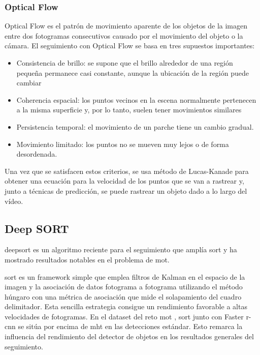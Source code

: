 \subsubsection*{Optical Flow}
\label{subsubsec:optical-flow}

Optical Flow es el patrón de movimiento aparente de los objetos de la imagen entre dos fotogramas consecutivos causado por el movimiento del objeto o la cámara. El seguimiento con Optical Flow se basa en tres supuestos importantes:

\begin{itemize}
    \item Consistencia de brillo: se supone que el brillo alrededor de una región pequeña permanece casi constante, aunque la ubicación de la región puede cambiar
    \item Coherencia espacial: los puntos vecinos en la escena normalmente pertenecen a la misma superficie y, por lo tanto, suelen tener movimientos similares
    \item Persistencia temporal: el movimiento de un parche tiene un cambio gradual.
    \item Movimiento limitado: los puntos no se mueven muy lejos o de forma desordenada.
\end{itemize}

Una vez que se satisfacen estos criterios, se usa método de Lucas-Kanade para obtener una ecuación para la velocidad de los puntos que se van a rastrear y, junto a técnicas de predicción, se puede rastrear un objeto dado a lo largo del vídeo.

\subsection{Deep SORT}
\label{subsec:deepsort-algorithm}

\gls{deepsort} \cite{Wojke2017simple} es un algoritmo reciente para el seguimiento que amplía \gls{sort} \cite{Bewley_2016} y ha mostrado resultados notables en el problema de \gls{mot}.

\gls{sort} es un framework simple que emplea filtros de Kalman en el espacio de la imagen y la asociación de datos fotograma a fotograma utilizando el método húngaro con una métrica de asociación que mide el solapamiento del cuadro delimitador. Esta sencilla estrategia consigue un rendimiento favorable a altas velocidades de fotogramas. En el dataset del reto \gls{mot} \cite{lealtaixe2015motchallenge}, \gls{sort} junto con Faster \gls{r-cnn} se sitúa por encima de \gls{mht} en las detecciones estándar. Esto remarca la influencia del rendimiento del detector de objetos en los resultados generales del seguimiento.


